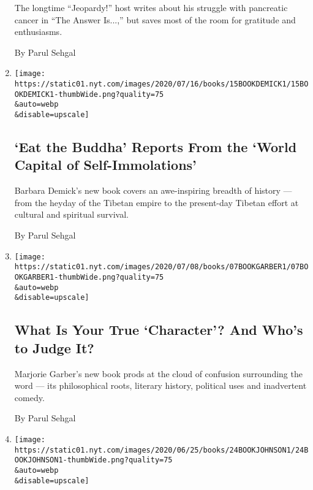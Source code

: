 \begin{enumerate}
  The longtime ``Jeopardy!'' host writes about his struggle with
  pancreatic cancer in ``The Answer Is...,'' but saves most of the room
  for gratitude and enthusiasms.

  By Parul Sehgal
\item
  \href{/2020/07/15/books/eat-buddha-life-death-tibetan-town-barbara-demick.html}{}

  \texttt{[image: https://static01.nyt.com/images/2020/07/16/books/15BOOKDEMICK1/15BOOKDEMICK1-thumbWide.png?quality=75\\\&auto=webp\\\&disable=upscale]}

  \hypertarget{eat-the-buddha-reports-from-the-world-capital-of-self-immolations}{%
  \subsection{`Eat the Buddha' Reports From the `World Capital of
  Self-Immolations'}\label{eat-the-buddha-reports-from-the-world-capital-of-self-immolations}}

  Barbara Demick's new book covers an awe-inspiring breadth of history
  --- from the heyday of the Tibetan empire to the present-day Tibetan
  effort at cultural and spiritual survival.

  By Parul Sehgal
\item
  \href{/2020/07/07/books/review-character-history-cultural-obsession-marjorie-garber.html}{}

  \texttt{[image: https://static01.nyt.com/images/2020/07/08/books/07BOOKGARBER1/07BOOKGARBER1-thumbWide.png?quality=75\\\&auto=webp\\\&disable=upscale]}

  \hypertarget{what-is-your-true-character-and-whos-to-judge-it}{%
  \subsection{What Is Your True `Character'? And Who's to Judge
  It?}\label{what-is-your-true-character-and-whos-to-judge-it}}

  Marjorie Garber's new book prods at the cloud of confusion surrounding
  the word --- its philosophical roots, literary history, political uses
  and inadvertent comedy.

  By Parul Sehgal
\item
  \href{/2020/06/24/books/review-true-history-first-mrs-meredith-diane-johnson.html}{}

  \texttt{[image: https://static01.nyt.com/images/2020/06/25/books/24BOOKJOHNSON1/24BOOKJOHNSON1-thumbWide.png?quality=75\\\&auto=webp\\\&disable=upscale]}


\end{enumerate}
